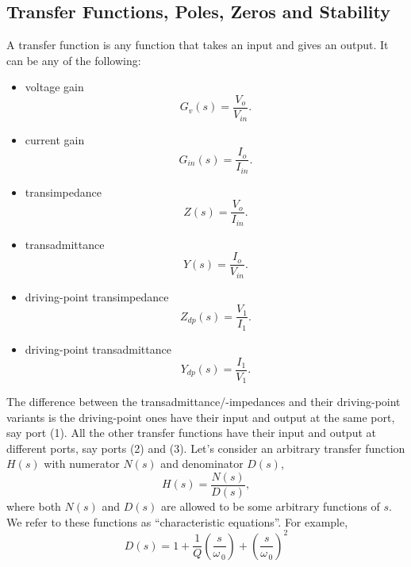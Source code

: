 \documentclass[12pt]{report}
\begin{document}
\subsection{Transfer Functions, Poles, Zeros and Stability}
A transfer function is any function that takes an input and gives an output. It can be any of the following:
\begin{itemize}
\item voltage gain
 \begin{equation}
\label{eq:14}
G_{v}(s) = \frac{V_{o}}{V_{in}}.
\end{equation}
\item current gain
  \begin{equation}
\label{eq:15}
G_{in}(s) = \frac{I_{o}}{I_{in}}.
\end{equation}
\item transimpedance
    \begin{equation}
  \label{eq:16}
Z(s) = \frac{V_{o}}{I_{in}}.
\end{equation}
\item transadmittance
  \begin{equation}
  \label{eq:17}
Y(s) = \frac{I_{o}}{V_{in}}.
\end{equation}
\item driving-point transimpedance
  \begin{equation}
  \label{eq:18}
Z_{dp}(s) = \frac{V_{1}}{I_{1}}.
\end{equation}  
 \item driving-point transadmittance
  \begin{equation}
  \label{eq:19}
Y_{dp}(s) = \frac{I_{1}}{V_{1}}.
\end{equation}  
\end{itemize}
The difference between the transadmittance/-impedances and their driving-point variants is the driving-point ones have their input and output at the same port, say port (1). All the other transfer functions have their input and output at different ports, say ports (2) and (3).
Let's consider an arbitrary transfer function $H(s)$ with numerator $N(s)$ and denominator $D(s)$,
\begin{equation}
\label{eq:20}
H(s) = \frac{N(s)}{D(s)},
\end{equation}
where both $N(s)$ and $D(s)$ are allowed to be some arbitrary functions of $s$. We refer to these functions as ``characteristic equations''. For example,
\begin{equation}
\label{eq:21}
D(s) = 1 + \frac{1}{Q} \left( \frac{s}{\omega_{\,0}} \right) + \left( \frac{s}{\omega_{\,0}} \right)^{2}
\end{equation}
\end{document}
